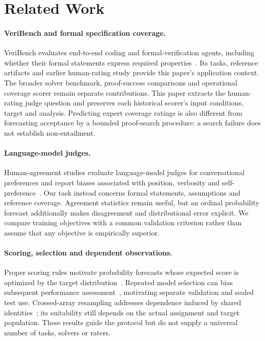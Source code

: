 \section{Related Work}
\label{sec:related}
\paragraph{VeriBench and formal specification coverage.}
VeriBench evaluates end-to-end coding and formal-verification agents, including whether their formal statements express required properties~\citep{veribench2026}.
Its tasks, reference artifacts and earlier human-rating study provide this paper's application context.
The broader solver benchmark, proof-success comparisons and operational coverage scorer remain separate contributions.
This paper extracts the human-rating judge question and preserves each historical scorer's input conditions, target and analysis.
Predicting expert coverage ratings is also different from forecasting acceptance by a bounded proof-search procedure: a search failure does not establish non-entailment.

\paragraph{Language-model judges.}
Human-agreement studies evaluate language-model judges for conversational preferences and report biases associated with position, verbosity and self-preference~\citep{zheng2023judging}.
Our task instead concerns formal statements, assumptions and reference coverage.
Agreement statistics remain useful, but an ordinal probability forecast additionally makes disagreement and distributional error explicit.
We compare training objectives with a common validation criterion rather than assume that any objective is empirically superior.

\paragraph{Scoring, selection and dependent observations.}
Proper scoring rules motivate probability forecasts whose expected score is optimized by the target distribution~\citep{gneiting2007strictly}.
Repeated model selection can bias subsequent performance assessment~\citep{cawley2010overfitting}, motivating separate validation and sealed test use.
Crossed-array resampling addresses dependence induced by shared identities~\citep{owen2012bootstrapping}; its suitability still depends on the actual assignment and target population.
These results guide the protocol but do not supply a universal number of tasks, solvers or raters.
